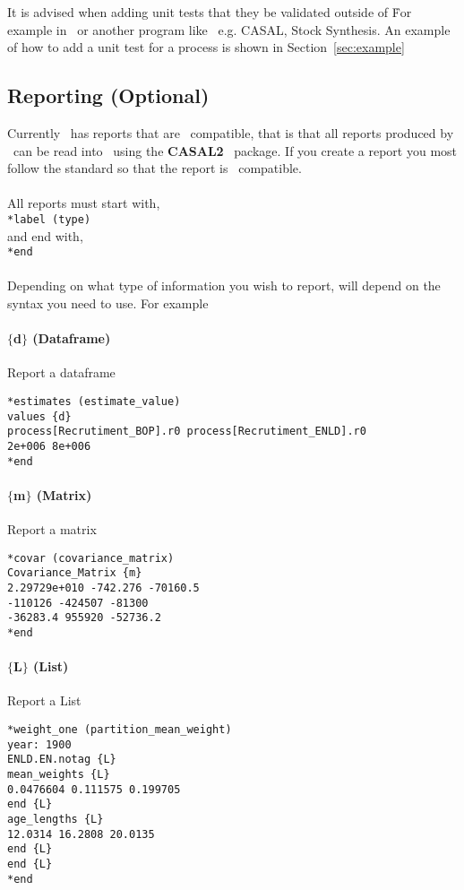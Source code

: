 It is advised when adding unit tests that they be validated outside of \CNAME\. For example in \R\ or another program like \CNAME\ e.g. CASAL, Stock Synthesis. An example of how to add a unit test for a process is shown in Section~\ref{sec:example}

\subsection{Reporting (Optional)}
Currently \CNAME\ has reports that are \R\ compatible, that is that all reports produced by \CNAME\ can be read into \R\ using the \textbf{CASAL2} \R\ package. If you create a report you most follow the standard so that the report is \R\ compatible.
\\\\
All reports must start with,
\\
\texttt{*label (type)}
\\ 
and end with,
\\
\texttt{*end}
\\\\
Depending on what type of information you wish to report, will depend on the syntax you need to use. For example
\paragraph*{$\{$d$\}$ (Dataframe)}
Report a dataframe
{\small{\begin{verbatim}
*estimates (estimate_value)
values {d}
process[Recrutiment_BOP].r0 process[Recrutiment_ENLD].r0 
2e+006 8e+006
*end
\end{verbatim}}}

\paragraph*{$\{$m$\}$ (Matrix)}
Report a matrix
{\small{\begin{verbatim}
*covar (covariance_matrix)
Covariance_Matrix {m}
2.29729e+010 -742.276 -70160.5
-110126 -424507 -81300 
-36283.4 955920 -52736.2 
*end
\end{verbatim}}}

\paragraph*{$\{$L$\}$ (List)}
Report a List
{\small{\begin{verbatim}
*weight_one (partition_mean_weight)
year: 1900
ENLD.EN.notag {L}
mean_weights {L}
0.0476604 0.111575 0.199705
end {L}
age_lengths {L}
12.0314 16.2808 20.0135
end {L}
end {L}
*end
\end{verbatim}}}



